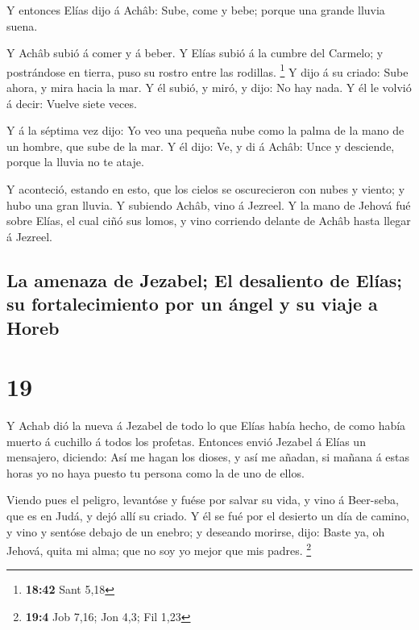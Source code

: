  Y entonces Elías dijo á Achâb: Sube, come y bebe; porque
una grande lluvia suena.

 Y Achâb subió á comer y á beber. Y Elías subió á la
cumbre del Carmelo; y postrándose en tierra, puso su rostro entre las
rodillas. \footnote{\textbf{18:42} Sant 5,18}  Y dijo á
su criado: Sube ahora, y mira hacia la mar. Y él subió, y miró, y dijo:
No hay nada. Y él le volvió á decir: Vuelve siete veces.

 Y á la séptima vez dijo: Yo veo una pequeña nube como la
palma de la mano de un hombre, que sube de la mar. Y él dijo: Ve, y di á
Achâb: Unce y desciende, porque la lluvia no te ataje.

 Y aconteció, estando en esto, que los cielos se
oscurecieron con nubes y viento; y hubo una gran lluvia. Y subiendo
Achâb, vino á Jezreel.  Y la mano de Jehová fué sobre
Elías, el cual ciñó sus lomos, y vino corriendo delante de Achâb hasta
llegar á Jezreel.

\hypertarget{la-amenaza-de-jezabel-el-desaliento-de-eluxedas-su-fortalecimiento-por-un-uxe1ngel-y-su-viaje-a-horeb}{%
\subsection{La amenaza de Jezabel; El desaliento de Elías; su
fortalecimiento por un ángel y su viaje a
Horeb}\label{la-amenaza-de-jezabel-el-desaliento-de-eluxedas-su-fortalecimiento-por-un-uxe1ngel-y-su-viaje-a-horeb}}

\hypertarget{section-18}{%
\section{19}\label{section-18}}

 Y Achab dió la nueva á Jezabel de todo lo que Elías había
hecho, de como había muerto á cuchillo á todos los profetas.
 Entonces envió Jezabel á Elías un mensajero, diciendo:
Así me hagan los dioses, y así me añadan, si mañana á estas horas yo no
haya puesto tu persona como la de uno de ellos.

 Viendo pues el peligro, levantóse y fuése por salvar su
vida, y vino á Beer-seba, que es en Judá, y dejó allí su criado.
 Y él se fué por el desierto un día de camino, y vino y
sentóse debajo de un enebro; y deseando morirse, dijo: Baste ya, oh
Jehová, quita mi alma; que no soy yo mejor que mis padres. \footnote{\textbf{19:4}
  Job 7,16; Jon 4,3; Fil 1,23}


